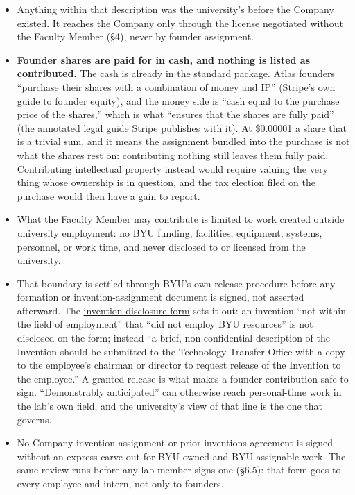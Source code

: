 \documentclass[11pt]{article}
\begin{document}
\begin{itemize}
\item Anything within that description was the university's before the
Company existed. It reaches the Company only through the license negotiated without the
Faculty Member (\S4), never by founder assignment.
\item \textbf{Founder shares are paid for in cash, and nothing is listed as
contributed.} The cash is already in the standard package. Atlas founders
``purchase their shares with a combination of money and IP''
\href{https://stripe.com/guides/atlas/equity}{(Stripe's own guide to founder
equity)}, and the money side is ``cash equal to the purchase price of the
shares,'' which is what ``ensures that the shares are fully paid''
\href{https://stripe.com/files/atlas/orrick-legal-guide.pdf}{(the annotated
legal guide Stripe publishes with it)}. At \$0.00001 a share that is a
trivial sum, and it means the assignment bundled into the purchase is not what the
shares rest on: contributing nothing still leaves them fully paid.
Contributing intellectual property instead would require valuing the very
thing whose ownership is in question, and the tax election filed on the purchase would then have a gain to
report.
\item What the Faculty Member may contribute is limited to work created
outside university employment: no BYU funding, facilities, equipment,
systems, personnel, or work time, and never disclosed to or licensed from the
university.
\item That boundary is settled through BYU's own release procedure before any
formation or invention-assignment document is signed, not asserted
afterward. The
\href{https://techtransfer.byu.edu/resources}{invention disclosure form} sets
it out: an invention ``not within the field of employment'' that ``did not
employ BYU resources'' is not disclosed on the form; instead ``a brief,
non-confidential description of the Invention should be submitted to the
Technology Transfer Office with a copy to the employee's chairman or director
to request release of the Invention to the employee.'' A granted release is what makes a founder contribution safe to sign.
``Demonstrably anticipated'' can otherwise reach personal-time work in the
lab's own field,
and the university's view of that line is the one that governs.
\item No Company invention-assignment or prior-inventions agreement is signed
without an express carve-out for BYU-owned and BYU-assignable work. The same
review runs before any lab member signs one (\S6.5): that form goes to every
employee and intern, not only to founders.
\end{itemize}
\end{document}
